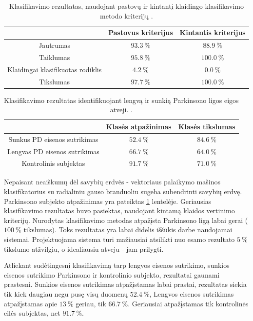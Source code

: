 \documentclass[]{vgtuef}
\begin{document}
\begin{table}
	\centering
  \renewcommand{\arraystretch}{1.3}
	\caption{Klasifikavimo rezultatas, naudojant pastovų ir kintantį klaidingo klasifikavimo metodo kriterijų \cite{5627904}.}
	\label{table:wireless_svm_pd_recognition}
	\begin{tabular}{|c|c|c|} \hline
		& Pastovus kriterijus & Kintantis kriterijus \\ \hline
	Jautrumas & $93.3~\%$ & $88.9~\%$ \\ \hline
	Taiklumas & $95.8~\%$ & $100.0~\%$ \\ \hline
	Klaidingai klasifikuotas rodiklis & $4.2~\%$ & $0.0~\%$ \\ \hline
	Tikslumas & $97.7~\%$ & $100.0~\%$ \\ \hline
	\end{tabular}
\end{table}

\begin{table}
	\centering
	\renewcommand{\arraystretch}{1.3}
	\caption{Klasifikavimo rezultatas identifikuojant lengvą ir sunkią Parkinsono ligos eigos atveji. \cite{5627904}.}
	\label{table:wireless_svm_recognition}
	\begin{tabular}{|c|c|c|} \hline
		& Klasės atpažinimas & Klasės tikslumas \\ \hline
	Sunkus PD eisenos sutrikimas & $52.4~\%$ & $84.6~\%$ \\ \hline
	Lengvas PD eisenos sutrikimas & $66.7~\%$ & $64.0~\%$ \\ \hline
	Kontrolinis subjektas & $91.7~\%$ & $71.0~\%$ \\ \hline
	\end{tabular}
\end{table}

Nepaisant neaiškumų dėl savybių erdvės - vektoriaus palaikymo mašinos klasifikatorius su radialiniu gauso branduoliu sugeba subendrinti savybių erdvę. Parkinsono subjekto atpažinimas yra pateiktas \ref{table:wireless_svm_pd_recognition} lentelėje. Geriausias klasifikavimo rezultatas buvo pasiektas, naudojant kintamą klaidos vertinimo kriterijų. Nurodytas klasifikavimo metodas atpažįsta Parkinsono ligą labai gerai ($100~\%$ tikslumas). Toks rezultatas yra labai didelis iššūkis darbe naudojamai sistemai. Projektuojama sistema turi mažiausiai atsilikti nuo esamo rezultato $5~\%$ tikslumo atžvilgiu, o idealiausiu atveju - jam prilygti. 

Atliekant sudėtingesnį klasifikavimą tarp lengvos eisenos sutrikimo, sunkios eisenos sutrikimo Parkinsono  ir kontrolinio subjekto, rezultatai gaunami prastesni. Sunkios eisenos sutrikimas atpažįstamas labai prastai, rezultatas siekia tik kiek daugiau negu pusę visų duomenų $52.4~\%$, Lengvos eisenos sutrikimas atpažįstamas apie $13~\%$ geriau, tik $66.7~\%$. Geriausiai atpažįstamas tik kontrolinės eilės subjektas, net $91.7~\%$.
\end{document}
